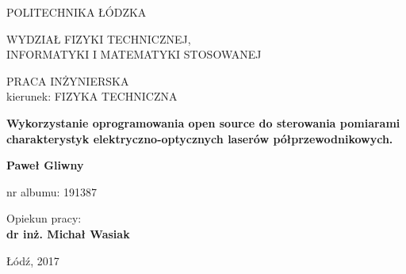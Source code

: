 \begin{titlepage}
 \begin{center}

  \vspace{0.5cm}
  \large{POLITECHNIKA ŁÓDZKA}

  \vspace{1cm}
  \normalsize{WYDZIAŁ FIZYKI TECHNICZNEJ, \\
  INFORMATYKI I MATEMATYKI STOSOWANEJ}

  \vspace{1.5cm}
  \large{PRACA INŻYNIERSKA \\kierunek: FIZYKA TECHNICZNA}

  \vspace{2cm}
  \Large\textbf{{Wykorzystanie oprogramowania open source do
    sterowania pomiarami charakterystyk
    elektryczno-optycznych laserów
    półprzewodnikowych.}}

  \vspace{2cm}
  \large\textbf{Paweł Gliwny}

  \large{nr albumu: 191387}

  \vspace{1cm}
  \begin{flushright}
  \large{Opiekun pracy:\\ \textbf{dr inż. Michał Wasiak}}
  \end{flushright}

  \vfill
  \normalsize{Łódź, 2017}
  \end{center}
\end{titlepage}